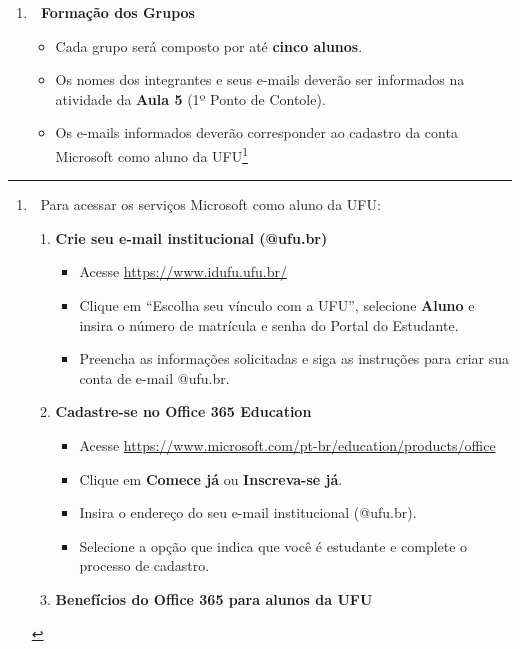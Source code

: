 \documentclass[
  a4paper,
]{book}
\providecommand{\tightlist}{%
  \setlength{\itemsep}{0pt}\setlength{\parskip}{0pt}}\usepackage{longtable,booktabs,array}
\begin{document}
\begin{enumerate}
\def\labelenumi{\arabic{enumi}.}
\item
  \textbf{👥 Formação dos Grupos}

  \begin{itemize}
  \item
    Cada grupo será composto por até \textbf{cinco alunos}.\\
  \item
    Os nomes dos integrantes e seus e-mails deverão ser informados na
    atividade da \textbf{Aula 5} (1º Ponto de Contole).\\
  \item
    Os e-mails informados deverão corresponder ao cadastro da conta
    Microsoft como aluno da UFU\footnote{📧 Para acessar os serviços
      Microsoft como aluno da UFU:

      \begin{enumerate}
      \def\labelenumii{\arabic{enumii}.}
      \tightlist
      \item
        \textbf{Crie seu e-mail institucional (@ufu.br)}

        \begin{itemize}
        \tightlist
        \item
          Acesse \url{https://www.idufu.ufu.br/}
        \item
          Clique em ``Escolha seu vínculo com a UFU'', selecione
          \textbf{Aluno} e insira o número de matrícula e senha do
          Portal do Estudante.
        \item
          Preencha as informações solicitadas e siga as instruções para
          criar sua conta de e-mail @ufu.br.
        \end{itemize}
      \item
        \textbf{Cadastre-se no Office 365 Education}

        \begin{itemize}
        \tightlist
        \item
          Acesse
          \url{https://www.microsoft.com/pt-br/education/products/office}
        \item
          Clique em \textbf{Comece já} ou \textbf{Inscreva-se já}.
        \item
          Insira o endereço do seu e-mail institucional (@ufu.br).
        \item
          Selecione a opção que indica que você é estudante e complete o
          processo de cadastro.
        \end{itemize}
      \item
        \textbf{Benefícios do Office 365 para alunos da UFU}


\end{enumerate}}
\end{itemize}
\end{enumerate}
\end{document}
